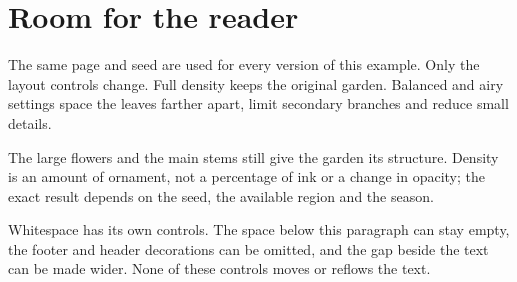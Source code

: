 \documentclass[11pt,a4paper]{article}
\begin{document}
\section*{Room for the reader}
The same page and seed are used for every version of this example. Only the layout
controls change. Full density keeps the original garden. Balanced and airy settings
space the leaves farther apart, limit secondary branches and reduce small details.

The large flowers and the main stems still give the garden its structure. Density is
an amount of ornament, not a percentage of ink or a change in opacity; the exact result
depends on the seed, the available region and the season.

Whitespace has its own controls. The space below this paragraph can stay empty,
the footer and header decorations can be omitted, and the gap beside the text can be
made wider. None of these controls moves or reflows the text.
\florilegiumtextend
\end{document}
